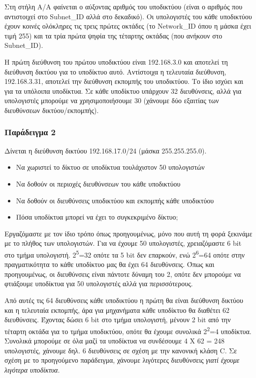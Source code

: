 Στη στήλη Α/Α φαίνεται ο αύξοντας αριθμός του υποδικτύου (είναι ο αριθμός που αντιστοιχεί στο Subnet\_ID αλλά στο δεκαδικό). Οι υπολογιστές του κάθε υποδικτύου έχουν κοινές ολόκληρες τις τρεις πρώτες οκτάδες (το Network\_ID όπου η μάσκα έχει τιμή 255) και τα τρία πρώτα ψηφία της τέταρτης οκτάδας (που ανήκουν στο Subnet\_ID).

Η πρώτη διεύθυνση του πρώτου υποδικτύου είναι 192.168.3.0 και αποτελεί τη διεύθυνση δικτύου για το υποδίκτυο αυτό. Αντίστοιχα η τελευταία διεύθυνση,\\ 192.168.3.31, αποτελεί την διεύθυνση εκπομπής του υποδικτύου. Το ίδιο ισχύει και για τα υπόλοιπα υποδίκτυα. Σε κάθε υποδίκτυο υπάρχουν 32 διευθύνσεις, αλλά για υπολογιστές μπορούμε να χρησιμοποιήσουμε 30 (χάνουμε δύο εξαιτίας των διευθύνσεων δικτύου/εκπομπής).

\subsubsection*{Παράδειγμα 2}

Δίνεται η διεύθυνση δικτύου 192.168.17.0/24 (μάσκα 255.255.255.0). 

\begin{itemize}
\item Να χωριστεί το δίκτυο σε υποδίκτυα τουλάχιστον 50 υπολογιστών
\item Να δοθούν οι περιοχές διευθύνσεων του κάθε υποδικτύου
\item Να δοθούν οι διευθύνσεις υποδικτύου και εκπομπής κάθε υποδικτύου
\item Πόσα υποδίκτυα μπορεί να έχει το συγκεκριμένο δίκτυο;
\end{itemize}

Εργαζόμαστε με τον ίδιο τρόπο όπως προηγουμένως, μόνο που αυτή τη φορά ξεκινάμε με το πλήθος των υπολογιστών. Για να έχουμε 50 υπολογιστές, χρειαζόμαστε 6 bit στο τμήμα υπολογιστή. 2\textsuperscript{5}=32 οπότε τα 5 bit δεν επαρκούν, ενώ 2\textsuperscript{6}=64 οπότε στην πραγματικότητα το κάθε υποδίκτυο μας θα έχει 64 διευθύνσεις. Όπως και προηγουμένως, οι διευθύνσεις είναι πάντοτε δύναμη του 2, οπότε δεν μπορούμε να φτιάξουμε υποδίκτυα για 50 υπολογιστές αλλά για περισσότερους. 

Από αυτές τις 64 διευθύνσεις κάθε υποδικτύου η πρώτη θα είναι διεύθυνση δικτύου και η τελευταία εκπομπής, άρα για μηχανήματα κάθε υποδίκτυο θα διαθέτει 62 διευθύνσεις. Έχοντας δώσει 6 bit στο τμήμα υπολογιστή, μένουν 2 bit από την τέταρτη οκτάδα για το τμήμα υποδικτύου, οπότε θα έχουμε συνολικά 2\textsuperscript{2}=4 υποδίκτυα. Συνολικά μπορούμε σε όλα μαζί τα υποδίκτυα να συνδέσουμε 4 Χ 62 = 248 υπολογιστές, χάνουμε δηλ. 6 διευθύνσεις σε σχέση με την κανονική κλάση C. Σε σχέση με το προηγούμενο παράδειγμα, χάνουμε λιγότερες διευθύνσεις \emph{γιατί έχουμε λιγότερα υποδίκτυα}.

